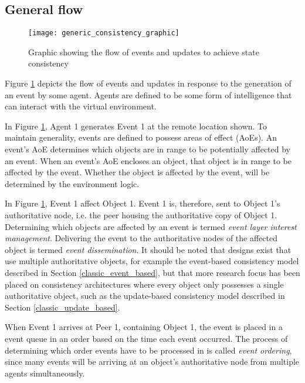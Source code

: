 \subsection{General flow}
\label{general_flow}

\begin{figure}[htbp]
 \centering
 \texttt{[image: generic\_consistency\_graphic]}
 \caption{Graphic showing the flow of events and updates to achieve state consistency}
 \label{fig_event_update_flow_graphic}
\end{figure}

Figure \ref{fig_event_update_flow_graphic} depicts the flow of events and updates in response to the generation of an event by some agent. Agents are defined to be some form of intelligence that can interact with the virtual environment.

In Figure \ref{fig_event_update_flow_graphic}, Agent 1 generates Event 1 at the remote location shown. To maintain generality, events are defined to possess areas of effect (AoEs). An event's AoE determines which objects are in range to be potentially affected by an event. When an event's AoE encloses an object, that object is in range to be affected by the event. Whether the object is affected by the event, will be determined by the environment logic.

In Figure \ref{fig_event_update_flow_graphic}, Event 1 affect Object 1. Event 1 is, therefore, sent to Object 1's authoritative node, i.e. the peer housing the authoritative copy of Object 1. Determining which objects are affected by an event is termed \emph{event layer interest management}. Delivering the event to the authoritative nodes of the affected object is termed \emph{event dissemination}. It should be noted that designs exist that use multiple authoritative objects, for example the event-based consistency model described in Section \ref{classic_event_based}, but that more research focus has been placed on consistency architectures where every object only possesses a single authoritative object, such as the update-based consistency model described in Section \ref{classic_update_based}.

When Event 1 arrives at Peer 1, containing Object 1, the event is placed in a event queue in an order based on the time each event occurred. The process of determining which order events have to be processed in is called \emph{event ordering}, since many events will be arriving at an object's authoritative node from multiple agents simultaneously.

